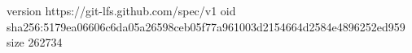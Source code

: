 version https://git-lfs.github.com/spec/v1
oid sha256:5179ea06606c6da05a26598ceb05f77a961003d2154664d2584e4896252ed959
size 262734
